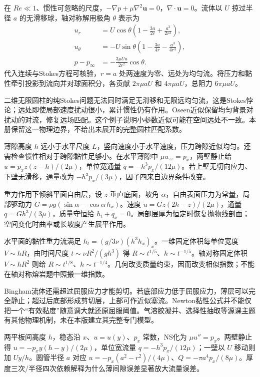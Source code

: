 在 $Re\ll1$、惯性可忽略的尺度，$-\nabla p+\mu\nabla^2\mathbf u=0$，$\nabla\cdot\mathbf u=0$。流体以 $U$ 掠过半径 $a$ 的无滑移球，轴对称解用极角 $\theta$ 表示为
\begin{align*}
u_r&=U\cos\theta\left(1-\frac{3a}{2r}+\frac{a^3}{2r^3}\right),\\
u_\theta&=-U\sin\theta\left(1-\frac{3a}{4r}-\frac{a^3}{4r^3}\right),\\
p-p_\infty&=-\frac{3\mu Ua}{2r^2}\cos\theta.
\end{align*}
代入连续与Stokes方程可核验，$r=a$ 处两速度为零、远处为均匀流。将压力和黏性牵引投影到流向并对球面积分，各贡献 $2\pi\mu aU$ 和 $4\pi\mu aU$，总阻力 $6\pi\mu aU$。

二维无限圆柱的纯Stokes问题无法同时满足无滑移和无限远均匀流，这是Stokes悖论；远处即使局部速度扰动很小，累计惯性仍有作用。Oseen近似保留均匀背景对扰动的对流，修复远场匹配。这个例子说明小参数近似可能在空间远处不一致。本册保留这一物理边界，不给出未展开的完整圆柱匹配系数。

薄隙高度 $h$ 远小于水平尺度 $L$，竖向速度小于水平速度，压力跨隙近似均匀。还需检查惯性相对于跨隙黏性足够小。在水平薄隙中 $\mu u_{zz}=p_x$，两壁静止给 $u=p_x z(z-h)/(2\mu)$，单位宽通量 $q=-h^3p_x/(12\mu)$。若上壁无切向应力、下壁无滑移，通量改为 $-h^3p_x/(3\mu)$，因子四来自边界条件改变。

重力作用下倾斜平面自由层，设 $z$ 垂直底面，坡角 $\alpha$，自由表面压力为常量，局部驱动力 $G=\rho g(\sin\alpha-\cos\alpha\,h_x)$。速度 $u=Gz(2h-z)/(2\mu)$，通量 $q=Gh^3/(3\mu)$，质量守恒给 $h_t+q_x=0$。局部层厚为恒定时恢复抛物线剖面；空间变化时曲率或长坡度产生展平作用。

水平面的黏性重力流满足 $h_t=(g/3\nu)(h^3h_x)_x$。一维固定体积每单位宽度 $V\sim hR$，由时间尺度 $t\sim\nu R^2/(g h^3)$ 得 $R\sim t^{1/5}$、$h\sim t^{-1/5}$。轴对称固定体积 $V\sim hR^2$ 则给 $R\sim t^{1/8}$、$h\sim t^{-1/4}$。几何改变质量约束，因而改变相似指数；不能在轴对称熔岩题中照搬一维指数。

Bingham流体还需超过屈服应力才能剪切。若底部应力低于屈服应力，薄层可以完全静止；超过后底部形成剪切层，上部可作近似塞流。Newton黏性公式并不能仅把一个“有效黏度”随意调大就还原屈服阈值。气溶胶凝并、选择性抽取等源课主题有其他物理机制，未在本版建立其完整专门模型。

两平板间高度 $h$，稳态沿 $x$、$u=u(y)$、$p_x$ 常数，NS化为 $\mu u''=p_x$。两壁静止得 $u=-p_x y(h-y)/(2\mu)$，单位宽流量 $q=-h^3p_x/(12\mu)$；一壁以 $U$ 移动则加 $Uy/h$。圆管半径 $a$ 对应 $u=-p_x(a^2-r^2)/(4\mu)$、$Q=-\pi a^4p_x/(8\mu)$。厚度三次/半径四次依赖解释为什么薄间隙误差显著放大流量误差。

